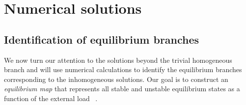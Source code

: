 
\section{Numerical solutions}
\label{sec:numerics}
\subsection{Identification of equilibrium branches}

We now turn our attention to the solutions beyond the trivial homogeneous branch and will use numerical calculations to identify the equilibrium branches corresponding to the inhomogeneous solutions. Our goal is to construct an \emph{equilibrium map} that represents all stable and unstable equilibrium states as a function of the external load~\cite{Pattamatta2014-pn}
.


